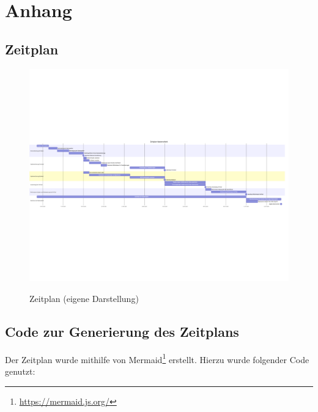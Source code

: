 \chapter{Anhang}

\section{Zeitplan}
\label{attachment:zeitplan}
\begin{figure}[H]
    \caption{Zeitplan (eigene Darstellung)}
    \includegraphics[width=1.0\linewidth, angle=90]{content/00_assets/meilensteine_gantt_diagram.png}
    \label{fig_zeitplan}
\end{figure}

\newpage

\section{Code zur Generierung des Zeitplans}
Der Zeitplan wurde mithilfe von Mermaid\footnote{\url{https://mermaid.js.org/}} erstellt. Hierzu wurde folgender Code genutzt:


